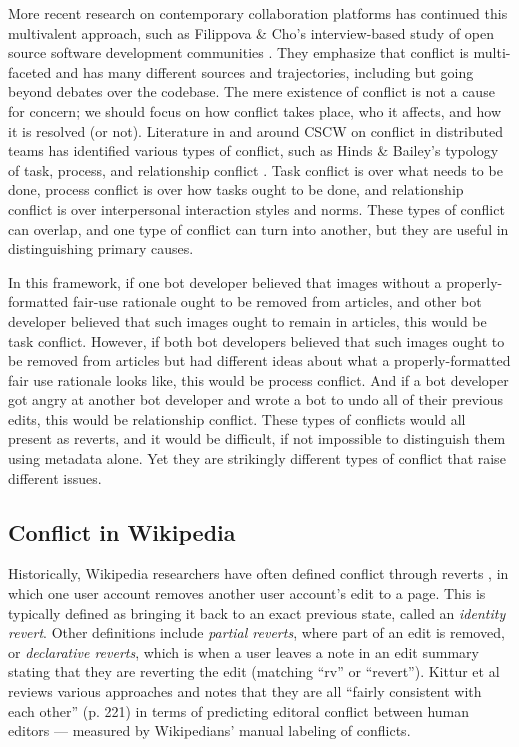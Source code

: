 \documentclass[format=acmsmall, review=false, screen=true]{acmart}%
\begin{document}
More recent research on contemporary collaboration platforms has continued this multivalent approach, such as Filippova \& Cho's interview-based study of open source software development communities \cite{Filippova2016}. They emphasize that conflict is multi-faceted and has many different sources and trajectories, including but going beyond debates over the codebase. The mere existence of conflict is not a cause for concern; we should focus on how conflict takes place, who it affects, and how it is resolved (or not). Literature in and around CSCW on conflict in distributed teams has identified various types of conflict, such as Hinds \& Bailey's typology of task, process, and relationship conflict \cite{Hinds2003}. Task conflict is over what needs to be done, process conflict is over how tasks ought to be done, and relationship conflict is over interpersonal interaction styles and norms. These types of conflict can overlap, and one type of conflict can turn into another, but they are useful in distinguishing primary causes.   

In this framework, if one bot developer believed that images without a properly-formatted fair-use rationale ought to be removed from articles, and other bot developer believed that such images ought to remain in articles, this would be task conflict. However, if both bot developers believed that such images ought to be removed from articles but had different ideas about what a properly-formatted fair use rationale looks like, this would be process conflict. And if a bot developer got angry at another bot developer and wrote a bot to undo all of their previous edits, this would be relationship conflict. These types of conflicts would all present as reverts, and it would be difficult, if not impossible to distinguish them using metadata alone. Yet they are strikingly different types of conflict that raise different issues.  

\subsection{Conflict in Wikipedia}  \label{s:lit:conflictwiki}

Historically, Wikipedia researchers have often defined conflict through reverts \cite{Halfaker2011, Halfaker2009, Pendleton2007, Viegas2004, Yasseri2012}, in which one user account removes another user account's edit to a page. This is typically defined as bringing it back to an exact previous state, called an \emph{identity revert}. Other definitions include \emph{partial reverts}, where part of an edit is removed, or \emph{declarative reverts}, which is when a user leaves a note in an edit summary stating that they are reverting the edit (matching  ``rv'' or  ``revert''). Kittur et al \cite{Kittur2010} reviews various approaches and notes that they are all ``fairly consistent with each other'' (p. 221) in terms of predicting editoral conflict between human editors --- measured by Wikipedians' manual labeling of conflicts.   
\end{document}
